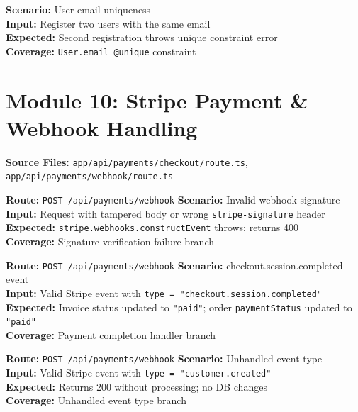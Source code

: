 \documentclass[12pt,a4paper]{report}
\newcommand{\pone}{\textbf{\color{p1red}P1}}
\newcommand{\ptwo}{\textbf{\color{p2orange}P2}}
\begin{document}
\begin{tcolorbox}[testbox,title={DB-005 \hfill \ptwo}]
\textbf{Scenario:} User email uniqueness \\
\textbf{Input:} Register two users with the same email \\
\textbf{Expected:} Second registration throws unique constraint error \\
\textbf{Coverage:} \texttt{User.email @unique} constraint
\end{tcolorbox}

\section{Module 10: Stripe Payment \& Webhook Handling}

\textbf{Source Files:} \texttt{app/api/payments/checkout/route.ts}, \texttt{app/api/payments/webhook/route.ts}

\begin{tcolorbox}[criticalbox,title={STRIPE-001 \hfill \pone\ --- Webhook Signature}]
\textbf{Route:} \texttt{POST /api/payments/webhook} \quad \textbf{Scenario:} Invalid webhook signature \\
\textbf{Input:} Request with tampered body or wrong \texttt{stripe-signature} header \\
\textbf{Expected:} \texttt{stripe.webhooks.constructEvent} throws; returns 400 \\
\textbf{Coverage:} Signature verification failure branch
\end{tcolorbox}

\begin{tcolorbox}[testbox,title={STRIPE-002 \hfill \pone}]
\textbf{Route:} \texttt{POST /api/payments/webhook} \quad \textbf{Scenario:} checkout.session.completed event \\
\textbf{Input:} Valid Stripe event with \texttt{type = "checkout.session.completed"} \\
\textbf{Expected:} Invoice status updated to \texttt{"paid"}; order \texttt{paymentStatus} updated to \texttt{"paid"} \\
\textbf{Coverage:} Payment completion handler branch
\end{tcolorbox}

\begin{tcolorbox}[testbox,title={STRIPE-003 \hfill \ptwo}]
\textbf{Route:} \texttt{POST /api/payments/webhook} \quad \textbf{Scenario:} Unhandled event type \\
\textbf{Input:} Valid Stripe event with \texttt{type = "customer.created"} \\
\textbf{Expected:} Returns 200 without processing; no DB changes \\
\textbf{Coverage:} Unhandled event type branch
\end{tcolorbox}
\end{document}
